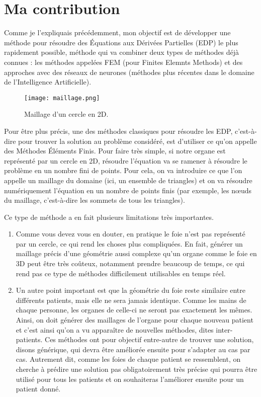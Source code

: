 \section{Ma contribution} \label{intro_contrib}
\graphicspath{{introduction/images/2_contrib}}

Comme je l’expliquais précédemment, mon objectif est de développer une méthode pour résoudre des Équations aux Dérivées Partielles (EDP) le plus rapidement possible, méthode qui va combiner deux types de méthodes déjà connues : les méthodes appelées FEM (pour Finites Elemnts Methods) et des approches avec des réseaux de neurones (méthodes plus récentes dans le domaine de l’Intelligence Artificielle).

\begin{minipage}{0.38\linewidth}
	\begin{figure}[H]
		\centering
		\texttt{[image: maillage.png]}
		\caption{Maillage d'un cercle en 2D.}
	\end{figure}
\end{minipage}
\begin{minipage}{0.58\linewidth}
	Pour être plus précis, une des méthodes classiques pour résoudre les EDP, c’est-à-dire pour trouver la solution au problème considéré, est d’utiliser ce qu’on appelle des Méthodes Éléments Finis. Pour faire très simple, si notre organe est représenté par un cercle en 2D, résoudre l’équation va se ramener à résoudre le problème en un nombre fini de points. Pour cela, on va introduire ce que l’on appelle un maillage du domaine (ici, un ensemble de triangles) et on va résoudre numériquement l’équation en un nombre de points finis (par exemple, les nœuds du maillage, c'est-à-dire les sommets de tous les triangles).
\end{minipage}

Ce type de méthode a en fait plusieurs limitations très importantes. 
\begin{enumerate}[label=\textbullet]
	\item Comme vous devez vous en douter, en pratique le foie n’est pas représenté par un cercle, ce qui rend les choses plus compliquées. En fait, générer un maillage précis d’une géométrie aussi complexe qu’un organe comme le foie en 3D peut être très coûteux, notamment prendre beaucoup de temps, ce qui rend pas ce type de méthodes difficilement utilisables en temps réel. 
	\item Un autre point important est que la géométrie du foie reste similaire entre différents patients, mais elle ne sera jamais identique. Comme les mains de chaque personne, les organes de celle-ci ne seront pas exactement les mêmes. Ainsi, on doit générer des maillages de l’organe pour chaque nouveau patient et c’est ainsi qu’on a vu apparaître de nouvelles méthodes, dites inter-patients. Ces méthodes ont pour objectif entre-autre de trouver une solution, disons générique, qui devra être améliorée ensuite pour s'adapter au cas par cas. Autrement dit, comme les foies de chaque patient se ressemblent, on cherche à prédire une solution pas obligatoirement très précise qui pourra être utilisé pour tous les patients et on souhaiteras l'améliorer ensuite pour un patient donné.
\end{enumerate}

